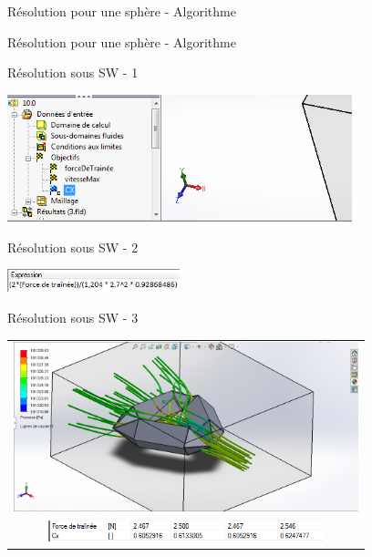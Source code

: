 \begin{frame}{Résolution pour une sphère - Algorithme}
  \begin{center}
    
  \end{center}
\end{frame}

\begin{frame}{Résolution pour une sphère - Algorithme}
  \begin{center}
    
  \end{center}
\end{frame}

\begin{frame}{Résolution sous SW - 1}
  \begin{center}
    \includegraphics[width=10cm]{../Images/objectifsSW.png}
  \end{center}
\end{frame}

\begin{frame}{Résolution sous SW - 2}
  \begin{center}
    \includegraphics[width=5cm]{../Images/expressionCX.png}
  \end{center}
\end{frame}

\begin{frame}{Résolution sous SW - 3}
	\begin{center}
		\begin{tabular}{c}
      \includegraphics[width=10cm]{../Images/Capture.PNG} \\
			\includegraphics[width=8cm]{../Images/resultatsSimulationSW.png}
		\end{tabular}
	\end{center}
\end{frame}

